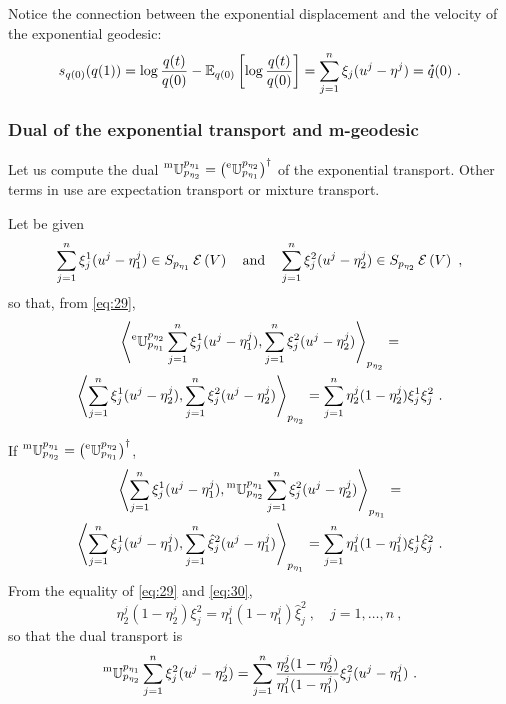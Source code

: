 \documentclass[12pt,a4paper]{amsart}
\begin{document}
Notice the connection between the exponential displacement and the velocity of the exponential geodesic:
\begin{equation}
  \label{eq:51}
  s_{q(0)}(q(1)) = \log \frac {q(t)}{q(0)} - \expectat {q(0)} {\log \frac {q(t)}{q(0)}} = \sum_{j=1}^n \xi_j(u^j - \eta^j) = \velocity q(0) \ .
\end{equation}

\subsubsection{Dual of the exponential transport and m-geodesic}
\label{sec:dual-expon-transp}
Let us compute the dual $\prescript{\text{m}}{} {\mathbb U} _ {p_{\eta_2}} ^ {p_{\eta_1}} = \left(\prescript{\text{e}}{} {\mathbb U} _ {p_{\eta_1}} ^ {p_{\eta_2}}\right)^\dagger$ of the exponential transport. Other terms in use are expectation transport or mixture transport.

Let be given
\begin{equation}
  \label{eq:38}
  \sum_{j=1}^n \xi_j^1(u^j - \eta^j_1) \in \expfibreat {p_{\eta_1}} V \quad \text{and} \quad \sum_{j=1}^n \xi_j^2(u^j - \eta^j_2) \in \expfibreat {p_{\eta_2}} V \ ,
\end{equation}
so that, from \cref{eq:29},
\begin{multline}
  \label{eq:39}
  \scalarat {p_{\eta_2}} {\etransport {p_{\eta_1}} {p_{\eta_2}}  \sum_{j=1}^n \xi_j^1(u^j - \eta^j_1)} {\sum_{j=1}^n \xi_j^2(u^j - \eta^j_2)} = \\
   \scalarat {p_{\eta_2}} {\sum_{j=1}^n \xi_j^1(u^j - \eta^j_2)} {\sum_{j=1}^n \xi_j^2(u^j - \eta^j_2)} = 
   \sum_{j=1}^n \eta^j_2(1-\eta^j_2) \xi_j^1 \xi_j^2 \ . 
 \end{multline}

If $\prescript{\text{m}}{} {\mathbb U} _ {p_{\eta_2}} ^ {p_{\eta_1}} = \left(\prescript{\text{e}}{} {\mathbb U} _ {p_{\eta_1}} ^ {p_{\eta_2}}\right)^\dagger$,
\begin{multline}
  \label{eq:39a}
  \scalarat {p_{\eta_1}} {\sum_{j=1}^n \xi_j^1(u^j - \eta^j_1)} {\mtransport {p_{\eta_2}} {p_{\eta_1}}\sum_{j=1}^n \xi_j^2(u^j - \eta^j_2)} = \\
   \scalarat {p_{\eta_1}} {\sum_{j=1}^n \xi_j^1(u^j - \eta^j_1)} {\sum_{j=1}^n \hat \xi_j^2(u^j - \eta^j_1)} = 
   \sum_{j=1}^n \eta^j_1(1-\eta^j_1) \xi_j^1 \hat \xi_j^2 \ . 
\end{multline}
From the equality of \cref{eq:29} and \cref{eq:30},
\begin{equation}
\eta^j_2(1-\eta^j_2) \xi_j^2 = \eta^j_1(1-\eta^j_1) \hat \xi_j^2 \ , \quad j=1,\dots,n \ ,
\end{equation}
so that the dual transport is
\begin{equation}
  \label{eq:39b}
\mtransport {p_{\eta_2}} {p_{\eta_1}} \sum_{j=1}^n \xi_j^2(u^j - \eta^j_2) = 
\sum_{j=1}^n \frac{\eta^j_2(1-\eta^j_2)} {\eta^j_1(1-\eta^j_1)} \xi_j^2 (u^j - \eta^j_1) \ .
\end{equation}
\end{document}

